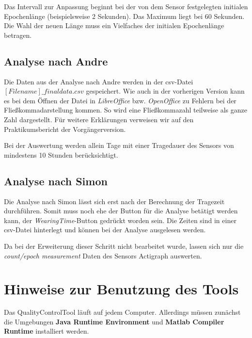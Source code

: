 \documentclass[onecolumn,german]{article}
\begin{document}
Das Intervall zur Anpassung beginnt bei der von dem Sensor festgelegten initialen Epochenlänge (beispielsweise 2 Sekunden). Das Maximum liegt bei 60 Sekunden. Die Wahl der neuen Länge muss ein Vielfaches der initialen Epochenlänge betragen.

\subsection{Analyse nach Andre}

Die Daten aus der Analyse nach Andre werden in der csv-Datei \textit{$[Filename]\_finaldata.csv$} gespeichert. Wie auch in der vorherigen Version kann es bei dem Öffnen der Datei in \textit{LibreOffice} bzw. \textit{OpenOffice} zu Fehlern bei der Fließkommadarstellung kommen. So wird eine Fließkommazahl teilweise als ganze Zahl dargestellt. Für weitere Erklärungen verweisen wir auf den Praktikumsbericht der Vorgängerversion.\newline

 Bei der Auswertung werden allein Tage mit einer Tragedauer des Sensors von mindestens 10 Stunden berücksichtigt.

\subsection{Analyse nach Simon}

Die Analyse nach Simon lässt sich erst nach der Berechnung der Tragezeit durchführen. Somit muss noch ehe der Button für die Analyse betätigt werden kann, der \textit{WearingTime}-Button gedrückt worden sein. Die Zeiten sind in einer csv-Datei hinterlegt und können bei der Analyse ausgelesen werden.\newline

Da bei der Erweiterung dieser Schritt nicht bearbeitet wurde, lassen sich nur die \textit{count/epoch measurement} Daten des Sensors Actigraph auswerten.
\newpage

\section{Hinweise zur Benutzung des Tools}\label{Hinweise}

Das QualityControlTool läuft auf jedem Computer. Allerdings müssen zunächst die Umgebungen \textbf{Java Runtime Environment\footnotemark} und \textbf{Matlab Compiler Runtime\footnotemark}
 installiert werden.\newline
\end{document}

